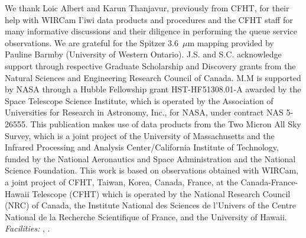 \documentclass[iop]{emulateapj}
\begin{document}
\bigskip We thank Loic Albert and Karun Thanjavur, previously from CFHT, for their help with WIRCam I'iwi data products and procedures and the CFHT staff for many informative discussions and their diligence in performing the queue service observations. We are grateful for the Spitzer 3.6~$\mu$m mapping provided by Pauline Barmby (University of Western Ontario).
J.S. and S.C. acknowledge support through respective Graduate Scholarship and Discovery grants from the Natural Sciences and Engineering Research Council of Canada.
M.M is supported by NASA through a Hubble Fellowship grant HST-HF51308.01-A awarded by the Space Telescope Science Institute, which is operated by the Association of Universities for Research in Astronomy, Inc., for NASA, under contract NAS 5-26555.
This publication makes use of data products from the Two Micron All Sky Survey, which is a joint project of the University of Massachusetts and the Infrared Processing and Analysis Center/California Institute of Technology, funded by the National Aeronautics and Space Administration and the National Science Foundation.
This work is based on observations obtained with WIRCam, a joint project of CFHT, Taiwan, Korea, Canada, France, at the Canada-France-Hawaii Telescope (CFHT) which is operated by the National Research Council (NRC) of Canada, the Institute National des Sciences de l'Univers of the Centre National de la Recherche Scientifique of France, and the University of Hawaii. 
{\it Facilities:} , .


\end{document}
